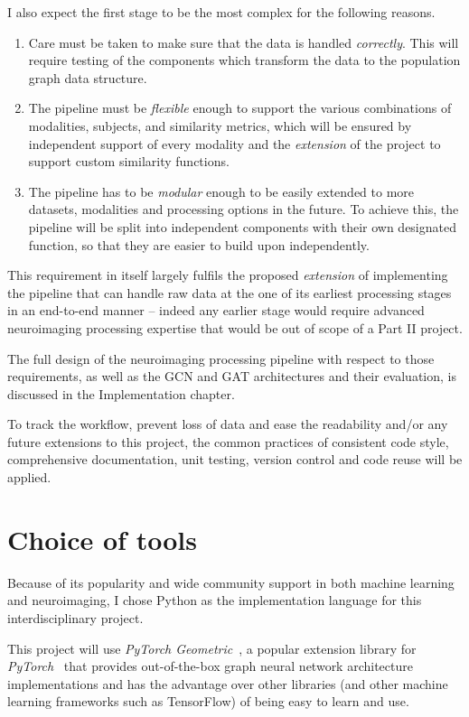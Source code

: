 I also expect the first stage to be the most complex for the following reasons.
\begin{enumerate}
    \item Care must be taken to make sure that the data is handled \textit{correctly}. This will require testing of the components which transform the data to the population graph data structure.
    \item The pipeline must be \textit{flexible} enough to support the various combinations of modalities, subjects, and similarity metrics, which will be ensured by independent support of every modality and the \textit{extension} of the project to support custom similarity functions.
    \item The pipeline has to be \textit{modular} enough to be easily extended to more datasets, modalities and processing options in the future. To achieve this, the pipeline will be split into independent components with their own designated function, so that they are easier to build upon independently.
\end{enumerate} 

This requirement in itself largely fulfils the proposed \textit{extension} of implementing the pipeline that can handle raw data at the one of its earliest processing stages in an end-to-end manner – indeed any earlier stage would require advanced neuroimaging processing expertise that would be out of scope of a Part II project. 

The full design of the neuroimaging processing pipeline with respect to those requirements, as well as the GCN and GAT architectures and their evaluation, is discussed in the Implementation chapter.

To track the workflow, prevent loss of data and ease the readability and/or any future extensions to this project, the common practices of consistent code style, comprehensive documentation, unit testing, version control and code reuse will be applied.

\section{Choice of tools}

Because of its popularity and wide community support in both machine learning and neuroimaging, I chose Python as the implementation language for this interdisciplinary project.

This project will use \textit{PyTorch Geometric}~\cite{fey2019pytorch}, a popular extension library for \textit{PyTorch}~\cite{pytorch} that provides out-of-the-box graph neural network architecture implementations and has the advantage over other libraries (and other machine learning frameworks such as TensorFlow) of being easy to learn and use. 


